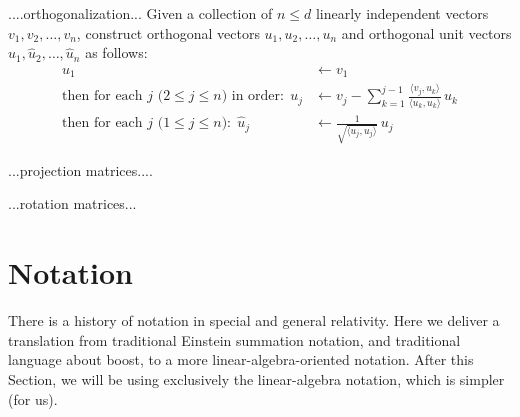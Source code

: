 \documentclass{article}
\newcommand{\inner}[2]{\langle{#1},{#2}\rangle}
\begin{document}
....orthogonalization... Given a collection of $n\leq d$ linearly independent vectors $v_1,v_2,\ldots,v_n$, construct orthogonal vectors $u_1,u_2,\ldots,u_n$ and orthogonal unit vectors $\hat{u}_1,\hat{u}_2,\ldots,\hat{u}_n$ as follows:
\begin{align}
    u_1 &\leftarrow v_1
    \\
    \mbox{then for each $j$ ($2\leq j\leq n$) in order:} ~~ u_j &\leftarrow v_j - \sum_{k=1}^{j-1} \frac{\inner{v_j}{u_k}}{\inner{u_k}{u_k}}\,u_k
    \\
    \mbox{then for each $j$ ($1\leq j\leq n$):} ~~ \hat{u}_j &\leftarrow \frac{1}{\sqrt{\inner{u_j}{u_j}}}\,u_j
\end{align}

...projection matrices....

...rotation matrices...

\section{Notation}\label{sec:notation}

There is a history of notation in special and general relativity.
Here we deliver a translation from traditional Einstein summation notation, and traditional language about boost, to a more linear-algebra-oriented notation.
After this Section, we will be using exclusively the linear-algebra notation, which is simpler (for us).
\end{document}
